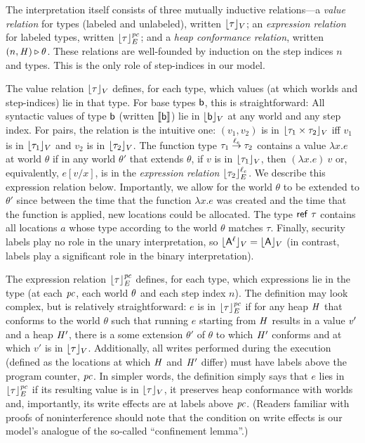The interpretation itself consists of three mutually inductive
relations---a \emph{value relation} for types (labeled and unlabeled),
written $\lfloor \tau \rfloor_{V}$; an \emph{expression relation} for labeled
types, written $\lfloor \tau \rfloor_{E}^{\mathit{pc}}$; and a \emph{heap conformance relation},
written $(n,\mathit{H}) \overset{}\triangleright \theta$. These relations are
well-founded by induction on the step indices $n$ and types. This is
the only role of step-indices in our model.

The value relation $\lfloor \tau \rfloor_{V}$ defines, for each type, which values
(at which worlds and step-indices) lie in that type. For base types
$\mathsf{b}$, this is straightforward: All syntactic values of type
$\mathsf{b}$ (written $\llbracket \mathsf{b} \rrbracket$) lie in $\lfloor \mathsf{b} \rfloor_{V}$ at any world and any step index. For pairs, the relation is
the intuitive one: $(v_1,v_2)$ is in $\lfloor \tau_1 \times \tau_2 \rfloor_{V}$ iff
$v_1$ is in $\lfloor \tau_1 \rfloor_{V}$ and $v_2$ is in $\lfloor \tau_2 \rfloor_{V}$. The
function type $\tau_1 \overset{\ell_e}\to \tau_2$ contains a value $\lambda x.e$ at
world $\theta$ if in any world $\theta'$ that extends $\theta$, if $v$
is in $\lfloor \tau_1 \rfloor_{V}$, then $(\lambda x.e)\ v$ or, equivalently,
$e[v/x]$, is in the \emph{expression relation} $\lfloor \tau_2 \rfloor_{E}^{\ell_e}$. We describe this expression relation below. Importantly,
we allow for the world $\theta$ to be extended to $\theta'$ since
between the time that the function $\lambda x.e$ was created and the
time that the function is applied, new locations could be
allocated. The type $\mathsf{ref}~\tau$ contains all locations $a$ whose type
according to the world $\theta$ matches $\tau$. Finally, security
labels play no role in the unary interpretation, so $\lfloor \mathsf{A}^{\ell} \rfloor_{V} = \lfloor \mathsf{A} \rfloor_{V}$ (in contrast, labels play a
significant role in the binary interpretation).

The expression relation $\lfloor \tau \rfloor_{E}^{\mathit{pc}}$ defines, for each type, which
expressions lie in the type (at each $\mathit{pc}$, each world $\theta$ and
each step index $n$). The definition may look complex, but is
relatively straightforward: $e$ is in $\lfloor \tau \rfloor_{E}^{\mathit{pc}}$ if for any heap
$\mathit{H}$ that conforms to the world $\theta$ such that running $e$
starting from $\mathit{H}$ results in a value $\mathit{v}'$ and a heap $\mathit{H}'$,
there is a some extension $\theta'$ of $\theta$ to which $\mathit{H}'$
conforms and at which $v'$ is in $\lfloor \tau \rfloor_{V}$. Additionally, all
writes performed during the execution (defined as the locations at
which $\mathit{H}$ and $\mathit{H}'$ differ) must have labels above the program
counter, $\mathit{pc}$. In simpler words, the definition simply says that $e$
lies in $\lfloor \tau \rfloor_{E}^{\mathit{pc}}$ if its resulting value is in $\lfloor \tau \rfloor_{V}$, it
preserves heap conformance with worlds and, importantly, its write
effects are at labels above $\mathit{pc}$. (Readers familiar with proofs of
noninterference should note that the condition on write effects is our
model's analogue of the so-called ``confinement lemma''.)

